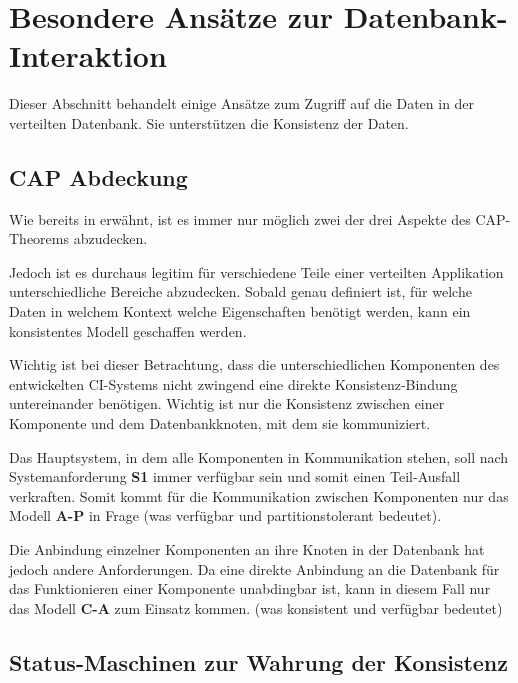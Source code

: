 \section{Besondere Ansätze zur Datenbank-Interaktion}
\label{sec:design:bes-ansaetze}

Dieser Abschnitt behandelt einige Ansätze zum Zugriff auf die Daten in der verteilten Datenbank.
Sie unterstützen die Konsistenz der Daten.



\subsection{CAP Abdeckung}

Wie bereits in  erwähnt,
ist es immer nur möglich zwei der drei Aspekte des CAP-Theorems abzudecken.

Jedoch ist es durchaus legitim für verschiedene Teile
einer verteilten Applikation unterschiedliche Bereiche abzudecken.
Sobald genau definiert ist, für welche Daten in welchem Kontext welche Eigenschaften benötigt werden,
kann ein konsistentes Modell geschaffen werden.

Wichtig ist bei dieser Betrachtung, dass die unterschiedlichen Komponenten des entwickelten CI-Systems
nicht zwingend eine direkte Konsistenz-Bindung untereinander benötigen.
Wichtig ist nur die Konsistenz zwischen einer Komponente
und dem Datenbankknoten, mit dem sie kommuniziert.

Das Hauptsystem, in dem alle Komponenten in Kommunikation stehen,
soll nach Systemanforderung \textbf{S1} immer verfügbar sein und somit einen Teil-Ausfall  verkraften.
Somit kommt für die Kommunikation zwischen Komponenten nur das Modell \textbf{A-P} in Frage
(was verfügbar und partitionstolerant bedeutet).

Die Anbindung einzelner Komponenten an ihre Knoten in der Datenbank hat jedoch andere Anforderungen.
Da eine direkte Anbindung an die Datenbank für das Funktionieren einer Komponente unabdingbar ist,
kann in diesem Fall nur das Modell \textbf{C-A} zum Einsatz kommen.
(was konsistent und verfügbar bedeutet)



\subsection{Status-Maschinen zur Wahrung der Konsistenz}

